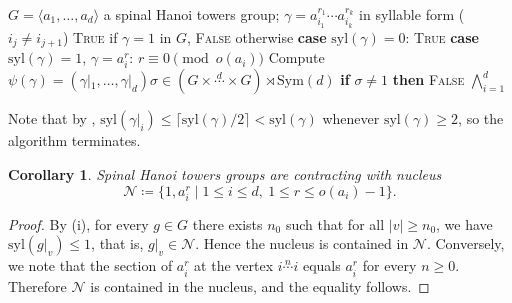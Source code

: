 \documentclass[11pt,leqno]{amsart}
\theoremstyle{plain}
\newtheorem{corollary}[corollary]{Corollary}
\newcommand{\Sym}{\mathrm{Sym}}
\newcommand{\Syl}{\mathrm{syl}}
\numberwithin{equation}{section}
\begin{document}
\begin{algorithm}[H]
\caption{Word problem for $G$ via sections}\label{alg:word-problem}
\begin{algorithmic}[1]
\Require $G = \langle a_1, \dots, a_d \rangle$ a spinal Hanoi towers group; $\gamma = a_{i_1}^{ r_1}\cdots a_{i_k}^{ r_k}$ in syllable form ($i_j \neq i_{j+1}$)
\Ensure \textsc{True} if $\gamma = 1$ in $G$, \textsc{False} otherwise
  \State \textbf{case} $\Syl(\gamma) = 0$: \Return \textsc{True}
  \State \textbf{case} $\Syl(\gamma) = 1$, $\gamma = a_i^r$: \Return $r \equiv 0 \pmod{o(a_i)}$
  \State Compute $\psi(\gamma) = (\gamma|_1, \dots, \gamma|_d) \sigma \in (G\times\stackrel{d}{\cdots}\times G) \rtimes \Sym(d)$
  \State \textbf{if} $\sigma \neq 1$ \textbf{then} \Return \textsc{False}
  \State \Return $\bigwedge_{i=1}^{d}$ 
\EndProcedure
\end{algorithmic}
\medskip
\end{algorithm}

Note that by , $\Syl(\gamma|_i) \leq \lceil \Syl(\gamma)/2 \rceil < \Syl(\gamma)$ whenever $\Syl(\gamma) \geq 2$, so the algorithm terminates.

\begin{corollary}\label{cornucleo}Spinal Hanoi towers groups are contracting with nucleus
\[
\mathcal{N}\coloneqq\{1, a_i^r \mid 1\le i\le d,\ 1\le r\le o(a_i)-1\}.
\]
\end{corollary}
\begin{proof}
By (i), for every $g\in G$ there exists $n_0$ such that for all $|v|\geq n_0$, we have $\Syl(g|_v)\leq 1$, that is, $g|_v\in\mathcal{N}$. Hence the nucleus is contained in $\mathcal{N}$. Conversely, we note that  the section of $a_i^r$ at the vertex $i\stackrel{n}{\cdots}i$ equals $a_i^r$ for every $n\geq 0$. Therefore $\mathcal{N}$ is contained in the nucleus, and the equality follows.
\end{proof}
\end{document}
